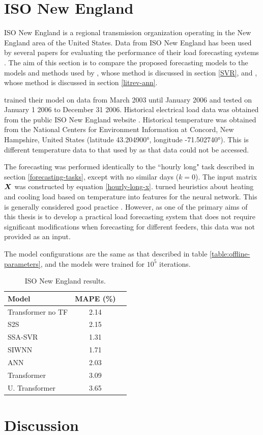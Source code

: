 \section{ISO New England}
ISO New England is a regional transmission organization operating in the New England area of the United States.
Data from ISO New England has been used by several papers for evaluating the performance of their load forecasting systems \cite{Ceperic2013}\cite{Chen2010}.
The aim of this section is to compare the proposed forecasting models to the models and methods used by \citet{Ceperic2013}, whose method is discussed in section \ref{SVR}, and \citet{Chen2010}, whose method is discussed in section \ref{litrev-ann}.

\citet{Ceperic2013} trained their model on data from March 2003 until January 2006 and tested on January 1 2006 to December 31 2006.
Historical electrical load data was obtained from the public ISO New England website \cite{isone}.
Historical temperature was obtained from the National Centers for Environment Information \cite{NOAA} at Concord, New Hampshire, United States (latitude 43.204900°, longitude \mbox{-71.502740°}).
This is different temperature data to that used by \citet{Ceperic2013} as that data could not be accessed.

The forecasting was performed identically to the ``hourly long" task described in section \ref{forecasting-tasks}, except with no similar days ($k=0$).
The input matrix ${\bm{X}}$ was constructed by equation \ref{hourly-long-x}.
\citet{Ceperic2013} turned heuristics about heating and cooling load based on temperature into features for the neural network.
This is generally considered good practice \cite{Zinkevich2018}.
However, as one of the primary aims of this thesis is to develop a practical load forecasting system that does not require significant modifications when forecasting for different feeders, this data was not provided as an input.

The model configurations are the same as that described in table \ref{table:offline-parameters}, and the models were trained for $10^5$ iterations.

\begin{table}[htbp]
	\caption{ISO New England results.}
	\begin{center}
		\begin{tabular}{l|cc}
			\textbf{Model}&\textbf{MAPE (\%)} \\
			\hline
			Transformer no TF            & 2.14 \\ %
			S2S                          & 2.15 \\ %
			SSA-SVR \cite{Ceperic2013}   & 1.31 \\
			SIWNN \cite{Chen2010}        & 1.71 \\
			ANN \cite{Chen2010}          & 2.03 \\
			Transformer                  & 3.09 \\ %
			U. Transformer               & 3.65 \\ %
			
		\end{tabular}
		\label{table:iso-results}
	\end{center}
\end{table}


\section{Discussion}